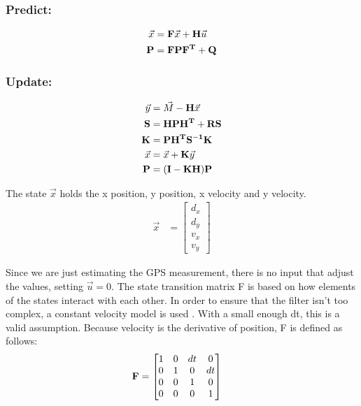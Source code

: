 \subsubsection*{Predict:}
\begin{align}
    \vec{x} &= \mathbf{F}\vec{x} + \mathbf{H}\vec{u} \label{eq:state_predict}\\ 
    \mathbf{P} &= \mathbf{F}\mathbf{P}\mathbf{F^T} + \mathbf{Q} \label{eq:var_predict}
\end{align}
\subsubsection*{Update:}
\begin{align}
    \vec{y} &= \vec{M} - \mathbf{H}\vec{x} \label{eq:innovation_up}\\
    \mathbf{S}&= \mathbf{HPH^T+RS} \label{eq:inter_up}\\
    \mathbf{K} &= \mathbf{PH^TS^{-1}K} \label{eq:kalgain_up}\\
    \vec{x} &= \vec{x} + \mathbf{K}\vec{y} \label{eq:state_up}\\
    \mathbf{P} &= \mathbf{(I-KH)P} \label{eq:var_up}
\end{align} \par
The state $\vec{x}$ holds the x position, y position, x velocity and y velocity. \\
\begin{align}
	\vec{x} &= \begin{bmatrix}
				d_x \\
				d_y\\
				v_x\\
				v_y
				\end{bmatrix}
\end{align}\par
Since we are just estimating the GPS measurement, there is no input that adjust the values, setting $\vec{u} = 0$. The state transition matrix F is based on how elements of the states interact with each other. In order to ensure that the filter isn't too complex, a constant velocity model is used \cite{kf_book}. With a small enough dt, this is a valid assumption. Because velocity is the derivative of position, F is defined as follows: 
\begin{align}
	\mathbf{F} &= \begin{bmatrix}
					1 & 0 & dt & 0 \\
					0 & 1 & 0 & dt \\
					0 & 0 & 1 & 0 \\
					0 & 0 & 0 & 1
				\end{bmatrix}
\end{align} \par
